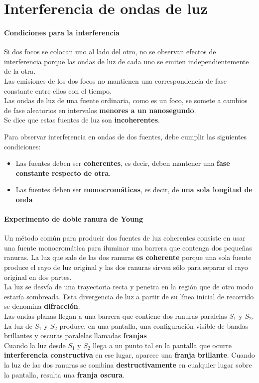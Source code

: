\documentclass[10pt]{article}
\begin{document}
\section{Interferencia de ondas de luz}

\paragraph{Condiciones para la interferencia}

Si dos focos se colocan uno al lado del otro, no se observan efectos de interferencia porque las ondas de luz de cada uno se emiten independientemente de la otra.\\ 
Las emisiones de los dos focos no mantienen una correspondencia de fase constante entre ellos con el
tiempo.\\ 
Las ondas de luz de una fuente ordinaria, como es un foco, se somete a cambios de fase aleatorios en intervalos \textbf{menores a un nanosegundo}.\\
Se dice que estas fuentes de luz son \textbf{incoherentes}.

Para observar interferencia en ondas de dos fuentes, debe cumplir las siguientes condiciones:
\begin{itemize}
	\item Las fuentes deben ser \textbf{coherentes}, es decir, deben mantener una \textbf{fase constante
respecto de otra}.
	\item  Las fuentes deben ser \textbf{monocromáticas}, es decir, de \textbf{una sola longitud de onda}
\end{itemize}

\paragraph{Experimento de doble ranura de Young}

Un método común para producir dos fuentes de luz coherentes consiste en usar una
fuente monocromática para iluminar una barrera que contenga dos pequeñas ranuras. La luz que sale de las dos ranuras \textbf{es coherente} porque una sola fuente produce el rayo de luz original y las dos ranuras sirven sólo
para separar el rayo original en dos partes.\\
\linebreak
La luz se desvía de una trayectoria recta y penetra en la región que de otro
modo estaría sombreada. Esta divergencia de luz a partir de su línea inicial de recorrido se denomina \textbf{difracción}.\\
\linebreak
Las ondas planas llegan a una barrera que contiene dos ranuras paralelas $S_1$ y $S_2$. La luz
de $S_1$ y $S_2$ produce, en una pantalla, una configuración visible de bandas brillantes y oscuras paralelas llamadas \textbf{franjas}\\
Cuando la luz desde $S_1$ y $S_2$ llega
a un punto tal en la pantalla que ocurre \textbf{interferencia constructiva} en ese lugar, aparece
una \textbf{franja brillante}. Cuando la luz de las dos ranuras se combina \textbf{destructivamente} en
cualquier lugar sobre la pantalla, resulta una \textbf{franja oscura}.
\end{document}
